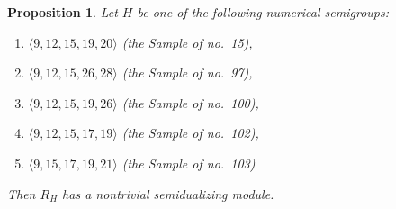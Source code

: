 \documentclass{amsart}
\theoremstyle{plain}
\newtheorem{prop}[theorem]{Proposition}
\theoremstyle{definition}
\numberwithin{theorem}{section}
\numberwithin{equation}{section}
\numberwithin{equation}{theorem}
\begin{document}
\begin{prop} \label{p45}
Let $H$ be one of the following numerical semigroups:
\begin{enumerate}[ \rm(1)]
\item $\langle9,12,15,19,20\rangle$ (the Sample of no.\ 15),
\item $\langle9,12,15,26,28\rangle$ (the Sample of no.\ 97),
\item $\langle9,12,15,19,26\rangle$ (the Sample of no.\ 100),
\item $\langle9,12,15,17,19\rangle$ (the Sample of no.\ 102),
\item $\langle9,15,17,19,21\rangle$ (the Sample of no.\ 103)
\end{enumerate}
Then $R_H$ has a nontrivial semidualizing module.
\end{prop}
\end{document}

